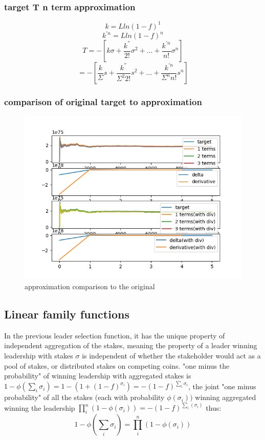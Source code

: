 \documentclass[a4paper]{article}
\begin{document}
\subsubsection{ target T n term approximation}

 $$ k = L ln (1-f)^1 $$
 $$ k^{'n} =  L ln (1-f)^n $$
 $$ T = -[k\sigma + \frac{k^{''}}{2!} \sigma^2 + \dots +\frac{ k^{'n}}{n!}\sigma^n] $$
 $$  = -[\frac{k}{\Sigma}s + \frac{k^{''}}{\Sigma^2 2!} s^2 + \dots +\frac{k^{'n}}{\Sigma^n n!} s^n] $$

\subsubsection{ comparison of original target to approximation }

\begin{figure}
  \includegraphics{target.png}
  \caption{approximation comparison to the original }
\end{figure}



\subsection {Linear family functions}

In the previous leader selection function, it has the unique
property of independent aggregation of the stakes, meaning the
property of a leader winning leadership with stakes $\sigma$
is independent of whether the stakeholder would act as a pool
of stakes, or distributed stakes on competing coins.  "one minus
the probability" of winning leadership with aggregated stakes is
$1-\phi(\sum_{i}\sigma_i)=1-(1+(1-f)^{\sigma_i})=-(1-f)^{\sum_{i}\sigma_i}$,
the joint "one minus probability" of all the stakes (each with
probability $\phi(\sigma_i))$ winning aggregated winning the leadership
$\prod_{i}^{n}(1-\phi(\sigma_i))=-(1-f)^{\sum_i(\sigma_i)}$ thus: $$
1-\phi(\sum_{i}\sigma_i) =\prod_{i}^{n}(1-\phi(\sigma_i)) $$
\end{document}
